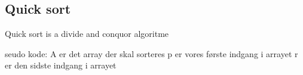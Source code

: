 \documentclass[letterpaper,10pt,danish]{sphinxmanual}
\begin{document}
\begin{sphinxVerbatim}[commandchars=\\\{\}]
  

   
  

     \PYG{p}{[}\PYG{p}{]}  \PYG{p}{[}\PYG{p}{]}
      
   
     \PYG{p}{[}\PYG{p}{]}  \PYG{p}{[}\PYG{p}{]}
      
   
     \PYG{p}{[}\PYG{p}{]}  \PYG{p}{[}\PYG{p}{]}
\end{sphinxVerbatim}


\subsection{Quick sort}
\label{\detokenize{Algorithmer/Sorting:quick-sort}}
\sphinxAtStartPar
Quick sort is a divide and conquor algoritme

\sphinxAtStartPar
seudo kode:
A er det array der skal sorteres
p er vores første indgang i arrayet
r er den sidste indgang i arrayet
\end{document}
